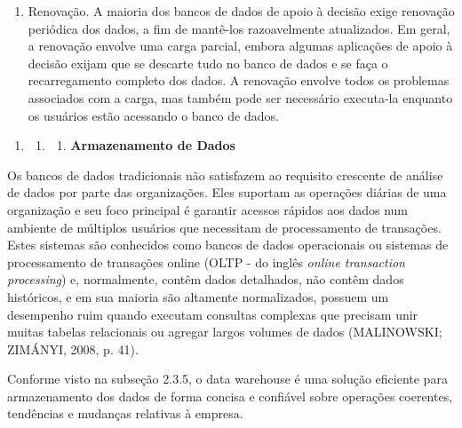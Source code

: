 \documentclass[a4paper]{article}
\newcommand\liststyleWWviiiNumi{%
\renewcommand\theenumi{\arabic{enumi}}
\renewcommand\theenumii{\arabic{enumi}.\arabic{enumii}}
\renewcommand\theenumiii{\arabic{enumi}.\arabic{enumii}.\arabic{enumiii}}
\renewcommand\theenumiv{\arabic{enumi}.\arabic{enumii}.\arabic{enumiii}.\arabic{enumiv}}
\renewcommand\labelenumi{\theenumi}
\renewcommand\labelenumii{\theenumii}
\renewcommand\labelenumiii{\theenumiii}
\renewcommand\labelenumiv{\theenumiv.}
}
\begin{document}
\begin{enumerate}
{de dados de apoio \`a decis\~ao, verificar a consist\^encia dos dados (isto \'e, fazer a verifica\c{c}\~ao da
integridade) e construir quaisquer \'indices necess\'arios.}
\item {\sffamily
Renova\c{c}\~ao. A maioria dos bancos de dados de apoio \`a decis\~ao exige renova\c{c}\~ao peri\'odica dos dados, a fim
de mant\^e-los razoavelmente atualizados. Em geral, a renova\c{c}\~ao envolve uma carga parcial, embora algumas
aplica\c{c}\~oes de apoio \`a decis\~ao exijam que se descarte tudo no banco de dados e se fa\c{c}a o recarregamento
completo dos dados. A renova\c{c}\~ao envolve todos os problemas associados com a carga, mas tamb\'em pode ser
necess\'ario executa-la enquanto os usu\'arios est\~ao acessando o banco de dados.}
\end{enumerate}

\bigskip

\liststyleWWviiiNumi
\begin{enumerate}
\item \begin{enumerate}
\item \begin{enumerate}
\item {\sffamily\bfseries
Armazenamento de Dados}
\end{enumerate}
\end{enumerate}
\end{enumerate}
{
\textsf{Os bancos de dados tradicionais n\~ao satisfazem ao requisito crescente de an\'alise de dados por parte das
organiza\c{c}\~oes. Eles suportam as opera\c{c}\~oes di\'arias de uma organiza\c{c}\~ao e seu foco principal \'e
garantir acessos r\'apidos aos dados num ambiente de m\'ultiplos usu\'arios que necessitam de processamento de
transa\c{c}\~oes. Estes sistemas s\~ao conhecidos como bancos de dados operacionais ou sistemas de processamento de
transa\c{c}\~oes online (OLTP - do ingl\^es }\textsf{\textit{online transaction processing}}\textsf{) e, normalmente,
cont\^em dados detalhados, n\~ao cont\^em dados hist\'oricos, e em sua maioria s\~ao altamente normalizados, possuem um
desempenho ruim quando executam consultas complexas que precisam unir muitas tabelas relacionais ou agregar largos
volumes de dados (MALINOWSKI; ZIM\'ANYI, 2008, p. 41).}}

{
\textsf{Conforme visto na subse\c{c}\~ao 2.3.5, o data warehouse \'e uma solu\c{c}\~ao eficiente para armazenamento dos
dados de forma concisa e confi\'avel sobre opera\c{c}\~oes coerentes, tend\^encias e mudan\c{c}as relativas \`a
empresa.}}
\end{document}
